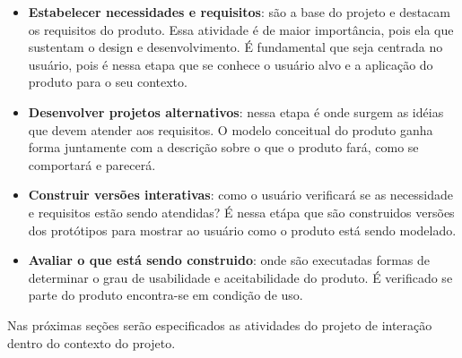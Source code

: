 \begin{itemize}
	\item \textbf{Estabelecer necessidades e requisitos}: são a base do projeto e destacam os requisitos do produto. Essa atividade é de maior importância, pois ela que sustentam o design e desenvolvimento. É fundamental que seja centrada no usuário, pois é nessa etapa que se conhece o usuário alvo e a aplicação do produto para o seu contexto.
	\item \textbf{Desenvolver projetos alternativos}: nessa etapa é onde surgem as idéias que devem atender aos requisitos. O modelo conceitual do produto ganha forma juntamente com a descrição sobre o que o produto fará, como se comportará e parecerá.
	\item \textbf{Construir versões interativas}: como o usuário verificará se as necessidade e requisitos estão sendo atendidas? É nessa etápa que são construidos versões dos protótipos para mostrar ao usuário como o produto está sendo modelado.
	\item \textbf{Avaliar o que está sendo construido}: onde são executadas formas de determinar o grau de usabilidade e aceitabilidade do produto. É verificado se parte do produto encontra-se em condição de uso.
\end{itemize}

Nas próximas seções serão especificados as atividades do projeto de interação dentro do contexto do projeto.